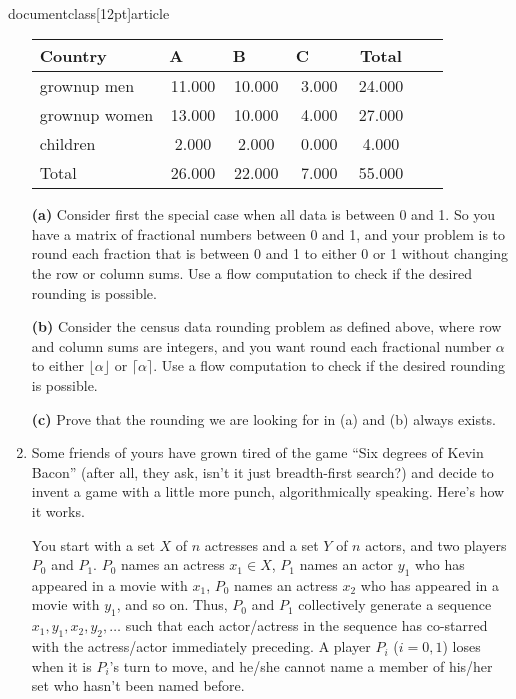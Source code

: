 \\documentclass[12pt]{article}
\begin{document}
\begin{enumerate}
\begin{table}[h]
\begin{center}
\begin{tabular}{|l||c|c|c|c|c||c|}
\hline Country & A ~~~ & B ~~~  & C ~~~ & Total \\  \hline
grownup men  &  11.000 & 10.000 & 3.000& 24.000\\
grownup women &  13.000 & 10.000 & 4.000 & 27.000  \\  \hline
children &  2.000 &   2.000 & 0.000 & 4.000  \\ \hline \hline
Total &  26.000 & 22.000 & 7.000 & 55.000  \\ \hline
\end{tabular}
\end{center}
\end{table}

\medskip
{\bf (a)} Consider first the special case when all data is between 0 and 1.
So you have a matrix of fractional numbers between 0 and 1, and your
problem is to round each fraction that is between 0 and 1 to either
0 or 1 without changing the row or column sums. Use a flow computation
to check if the desired rounding is possible.

\medskip
{\bf (b)} Consider the census data rounding problem as defined above,
where row and column sums are integers, and you want round each fractional
number $\alpha$ to either $\lfloor \alpha \rfloor$ or
$\lceil \alpha \rceil$. Use a flow computation
to check if the desired rounding is possible.

\medskip
{\bf (c)} Prove that the rounding we are looking for in
(a) and (b) always exists.



\item\Star
Some friends of yours have grown tired of the
game ``Six degrees of Kevin Bacon''
(after all, they ask, isn't it just breadth-first search?)
and decide to invent a game with a little more
punch, algorithmically speaking.
Here's how it works.

You start with a set $X$ of $n$ actresses and
a set $Y$ of $n$ actors,
and two players $P_0$ and $P_1$.
$P_0$ names an actress $x_1 \in X$, $P_1$ names an actor
$y_1$ who has appeared in a movie with $x_1$,
$P_0$ names an actress $x_2$ who has appeared in a movie with $y_1$,
and so on.
Thus, $P_0$ and $P_1$ collectively generate a sequence
$x_1, y_1, x_2, y_2, \ldots$
such that each actor/actress in the sequence has co-starred
with the actress/actor immediately preceding.
A player $P_i$ ($i = 0, 1$) loses when it is $P_i$'s turn to move, and
he/she cannot name a member of his/her set who hasn't been named before.


\end{enumerate}
\end{document}

